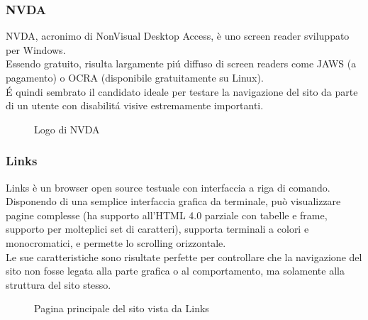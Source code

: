 \documentclass[]{article}
\begin{document}
\subsubsection*{NVDA}
NVDA, acronimo di NonVisual Desktop Access, è uno screen reader sviluppato per Windows.\\
Essendo gratuito, risulta largamente piú diffuso di screen readers come JAWS (a pagamento) o OCRA (disponibile gratuitamente su Linux).\\
É quindi sembrato il candidato ideale per testare la navigazione del sito da parte di un utente con disabilitá visive estremamente importanti.
\begin{figure}[H]
	\centering
	\caption{Logo di NVDA}
\end{figure}
\subsubsection*{Links}
Links è un browser open source testuale con interfaccia a riga di comando.\\
Disponendo di una semplice interfaccia grafica da terminale, può visualizzare pagine complesse (ha supporto all'HTML 4.0 parziale con tabelle e frame, supporto per molteplici set di caratteri), supporta terminali a colori e monocromatici, e permette lo scrolling orizzontale.\\
Le sue caratteristiche sono risultate perfette per controllare che la navigazione del sito non fosse legata alla parte grafica o al comportamento, ma solamente alla struttura del sito stesso.

\begin{figure}[H]
	\centering
	\caption{Pagina principale del sito vista da Links}
\end{figure}
\end{document}

